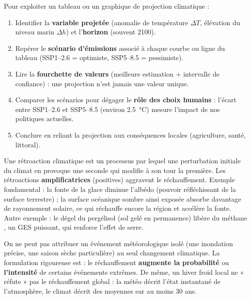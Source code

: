 \documentclass[11pt]{article}
\newcommand{\cle}[1]{{\popxbold\color{popdark}#1}}
\begin{document}
\begin{methode}
Pour exploiter un tableau ou un graphique de projection climatique :
\begin{enumerate}
\item Identifier la \textbf{variable projetée} (anomalie de température $\Delta T$, élévation du niveau marin $\Delta h$) et l'\textbf{horizon} (souvent 2100).
\item Repérer le \textbf{scénario d'émissions} associé à chaque courbe ou ligne du tableau (SSP1--2.6 = optimiste, SSP5--8.5 = pessimiste).
\item Lire la \textbf{fourchette de valeurs} (meilleure estimation + intervalle de confiance) : une projection n'est jamais une valeur unique.
\item Comparer les scénarios pour dégager le \textbf{rôle des choix humains} : l'écart entre SSP1--2.6 et SSP5--8.5 (environ \SI{2,5}{\celsius}) mesure l'impact de nos politiques actuelles.
\item Conclure en reliant la projection aux conséquences locales (agriculture, santé, littoral).
\end{enumerate}
\end{methode}

\begin{propriete}
Une \cle{rétroaction climatique} est un processus par lequel une perturbation initiale du climat en provoque une seconde qui modifie à son tour la première. Les rétroactions \textbf{amplificatrices} (positives) aggravent le réchauffement. Exemple fondamental : la fonte de la glace diminue l'\cle{albédo} (pouvoir réfléchissant de la surface terrestre) ; la surface océanique sombre ainsi exposée absorbe davantage de rayonnement solaire, ce qui réchauffe encore la région et accélère la fonte. Autre exemple : le dégel du \cle{pergélisol} (sol gelé en permanence) libère du méthane , un GES puissant, qui renforce l'effet de serre.
\end{propriete}

\begin{attention}
On ne peut pas attribuer un événement météorologique isolé (une inondation précise, une saison sèche particulière) au seul changement climatique. La formulation rigoureuse est : le réchauffement \textbf{augmente la probabilité} ou \textbf{l'intensité} de certains événements extrêmes. De même, un hiver froid local ne « réfute » pas le réchauffement global : la météo décrit l'état instantané de l'atmosphère, le climat décrit des moyennes sur au moins 30 ans.
\end{attention}
\end{document}
